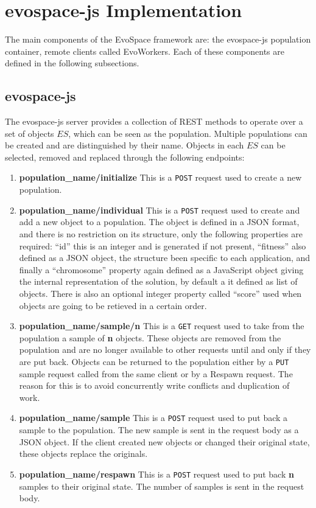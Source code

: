 \section{{\sf evospace-js} Implementation}
\label{sec:evo}
The main components of the EvoSpace framework are: the {\sf evospace-js} 
population container, remote clients called EvoWorkers.
Each of these components are defined in the following subsections.

\subsection{{\sf evospace-js}} %
 \label{sec:evospace}
The {\sf evospace-js} server provides a collection of REST methods  
to operate over a set of objects $ES$, which can be seen as the 
population. Multiple populations can be created and are 
distinguished by their name. Objects in each $ES$ 
can be selected, removed and replaced through the 
following endpoints:
\begin{enumerate}
    \item {\bf population\_name/initialize} 
    This is a {\tt POST} request used to create a new population.
    \item {\bf population\_name/individual} 
    This is a {\tt POST} request used to create and add a new object
    to a population. The object is defined in a JSON format, 
    and there is no restriction on its structure, only 
    the following properties are required: ``id'' this is an 
    integer and is generated if not present, ``fitness'' also defined 
    as a JSON object, the structure been specific to each application, 
    and finally a ``chromosome'' property again defined as
    a JavaScript object giving the internal representation of 
    the solution, by default a it defined as list of objects. 
    There is also an optional integer property called 
    ``score'' used when objects are going to be retieved in a certain order.
    \item {\bf population\_name/sample/n}
    This is a {\tt GET}  request used to take from the population a 
    sample of {\bf n} objects. These objects are removed from the 
    population and are no longer available
    to other requests until and only if they are put back. 
    Objects can be returned to the population 
    either by a {\tt PUT} sample request called from the same 
    client or by a Respawn request. The reason for 
    this is to avoid concurrently write conflicts and duplication of work.
    \item {\bf population\_name/sample}
    This is a {\tt POST} request used to put back a sample to the population.
    The new sample is sent in the request body as a JSON object. 
    If the client created new objects or 
    changed their original state, these objects replace the originals. 
    \item {\bf population\_name/respawn}
    This is a {\tt POST} request used to put back {\bf n} samples to their 
    original state. The number of samples is sent in the request body. 
\end{enumerate}

